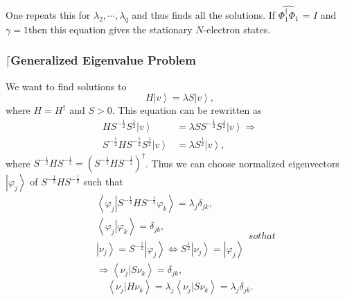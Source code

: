 \documentclass[aps,preprint]{revtex4}%
\begin{document}
One repeats this for $\lambda_{2},\cdots,\lambda_{q}$ and thus finds all the
solutions. If $\widehat{\Phi_{1}^{\dagger}\Phi_{1}}$ = $I$ and $\gamma=1$then
this equation gives the stationary $N$-electron states.

\subsubsection{$\lceil$Generalized Eigenvalue Problem}

We want to find solutions to
\begin{equation}
H\left\vert v\right\rangle =\lambda S\left\vert v\right\rangle ,
\end{equation}
where $H=H^{\dagger}$ and $S>0.$ This equation can be rewritten as
\begin{align}
HS^{-\frac{1}{2}}S^{\frac{1}{2}}\left\vert v\right\rangle  &  =\lambda
SS^{-\frac{1}{2}}S^{\frac{1}{2}}\left\vert v\right\rangle \Rightarrow
\nonumber\\
S^{-\frac{1}{2}}HS^{-\frac{1}{2}}S^{\frac{1}{2}}\left\vert v\right\rangle  &
=\lambda S^{\frac{1}{2}}\left\vert v\right\rangle ,
\end{align}
where $S^{-\frac{1}{2}}HS^{-\frac{1}{2}}=\left(  S^{-\frac{1}{2}}HS^{-\frac
{1}{2}}\right)  ^{\dagger}$. Thus we can choose normalized eigenvectors
$\left\vert \varphi_{j}\right\rangle $ of $S^{-\frac{1}{2}}HS^{-\frac{1}{2}}$
such that
\begin{subequations}
\begin{align}
&  \left\langle \varphi_{j}\left\vert S^{-\frac{1}{2}}HS^{-\frac{1}{2}}%
\varphi_{k}\right.  \right\rangle =\lambda_{j}\delta_{jk},\nonumber\\
&  \left\langle \varphi_{j}\left\vert \varphi_{k}\right.  \right\rangle
=\delta_{jk},\nonumber\\
&  \left\vert \nu_{j}\right\rangle =S^{-\frac{1}{2}}\left\vert \varphi
_{j}\right\rangle \Leftrightarrow S^{\frac{1}{2}}\left\vert \nu_{j}%
\right\rangle =\left\vert \varphi_{j}\right\rangle \nonumber\\
&  \Rightarrow\left\langle \nu_{j}\left\vert S\nu_{k}\right.  \right\rangle
=\delta_{jk},
\end{align}
so that
\end{subequations}
\begin{equation}
\left\langle \nu_{j}\left\vert H\nu_{k}\right.  \right\rangle =\lambda
_{j}\left\langle \nu_{j}\left\vert S\nu_{k}\right.  \right\rangle =\lambda
_{j}\delta_{jk}.
\end{equation}
\end{document}
